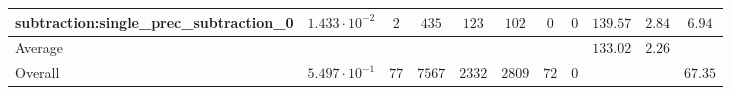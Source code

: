 \begin{tabular}{|l|c|c|c|c|c|c|c|c|c|c|}
subtraction:single\_prec\_subtraction\_0         & $ 1.433 \cdot 10^{-2} $ & $ 2      $ & $ 435  $ & $ 123  $ & $ 102   $ & $ 0  $ & $ 0 $ & $ 139.57      $ & $ 2.84    $ & $ 6.94    $ \\
\hline
Average                                          & $                     $ & $        $ & $      $ & $      $ & $       $ & $    $ & $   $ & $ 133.02      $ & $ 2.26    $ & $         $ \\
\hline
Overall                                          & $ 5.497 \cdot 10^{-1} $ & $ 77     $ & $ 7567 $ & $ 2332 $ & $ 2809  $ & $ 72 $ & $ 0 $ & $             $ & $         $ & $ 67.35   $ \\
\hline
\end{tabular}
